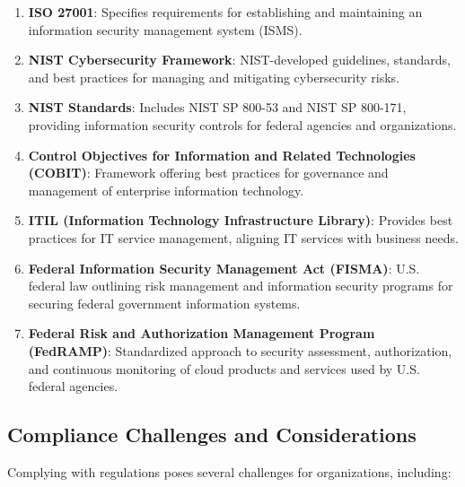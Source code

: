 \documentclass[conference]{IEEEtran}
\begin{document}
\begin{enumerate}
    \item \textbf{ISO 27001}: Specifies requirements for establishing and maintaining an information security management system (ISMS).

    \item \textbf{NIST Cybersecurity Framework}: NIST-developed guidelines, standards, and best practices for managing and mitigating cybersecurity risks.

    \item \textbf{NIST Standards}: Includes NIST SP 800-53 and NIST SP 800-171, providing information security controls for federal agencies and organizations.

    \item \textbf{Control Objectives for Information and Related Technologies (COBIT)}: Framework offering best practices for governance and management of enterprise information technology.

    \item \textbf{ITIL (Information Technology Infrastructure Library)}: Provides best practices for IT service management, aligning IT services with business needs.

    \item \textbf{Federal Information Security Management Act (FISMA)}: U.S. federal law outlining risk management and information security programs for securing federal government information systems.

    \item \textbf{Federal Risk and Authorization Management Program (FedRAMP)}: Standardized approach to security assessment, authorization, and continuous monitoring of cloud products and services used by U.S. federal agencies.
\end{enumerate}

\subsection{Compliance Challenges and Considerations}

Complying with regulations poses several challenges for organizations, including:
\end{document}
